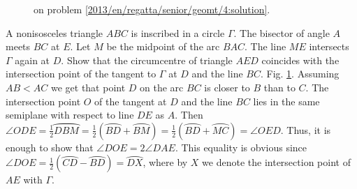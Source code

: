 \ifsolution
\begin{figure}\centering
    \caption{on problem \ref{2013/en/regatta/senior/geomt/4:solution}.}
    \label{2013/en/regatta/senior/geomt/4:solution:fig}
\end{figure}%
\fi %


\problem
A nonisosceles triangle $ABC$ is inscribed in a circle $\Gamma$.
The bisector of angle $A$ meets $BC$ at $E$.
Let $M$ be the midpoint of the arc $BAC$.
The line $ME$ intersects $\Gamma$ again at $D$.
Show that the circumcentre of triangle $AED$ coincides with the intersection
point of the tangent to $\Gamma$ at $D$ and the line $BC$.
\solution
\label{2013/en/regatta/senior/geomt/4:solution}%
\ifx\wideparen\undefined\else\let\widearc\wideparen\fi
\ifx\overparen\undefined\else\let\widearc\overparen\fi
Fig. \ref{2013/en/regatta/senior/geomt/4:solution:fig}.
Assuming $AB < AC$ we get that point $D$ on the arc $BC$ is closer to $B$ than
to $C$.
The intersection point $O$ of the tangent at $D$ and the line $BC$ lies in the
same semiplane with respect to line $DE$ as $A$.
Then
\(
    \angle ODE = \frac{1}{2} \widearc{DBM}
=
    \frac{1}{2} (\widearc{BD} + \widearc{BM})
=
    \frac{1}{2} (\widearc{BD} + \widearc{MC})
=
    \angle OED
\).
Thus, it is enough to show that $\angle DOE = 2\angle DAE$.
This equality is obvious since
$\angle DOE = \frac{1}{2} (\widearc{CD} - \widearc{BD}) = \widearc{DX}$,
where by $X$ we denote the intersection point of $AE$ with $\Gamma$.
\endproblem
